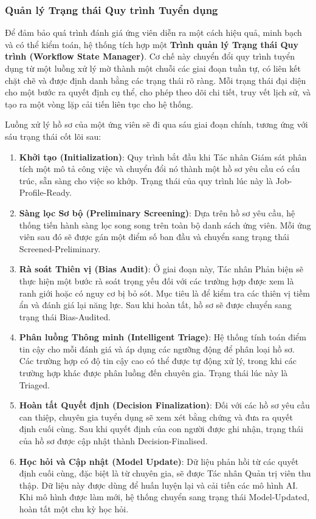 \documentclass{article}
\begin{document}
\begin{itemize}[topsep=0pt, itemsep=4pt, leftmargin=40pt]
\subsubsection{Quản lý Trạng thái Quy trình Tuyển dụng}
Để đảm bảo quá trình đánh giá ứng viên diễn ra một cách hiệu quả, minh bạch và có thể kiểm toán, hệ thống tích hợp một \textbf{Trình quản lý Trạng thái Quy trình (Workflow State Manager)}. Cơ chế này chuyển đổi quy trình tuyển dụng từ một luồng xử lý mờ thành một chuỗi các giai đoạn tuần tự, có liên kết chặt chẽ và được định danh bằng các trạng thái rõ ràng. Mỗi trạng thái đại diện cho một bước ra quyết định cụ thể, cho phép theo dõi chi tiết, truy vết lịch sử, và tạo ra một vòng lặp cải tiến liên tục cho hệ thống.

Luồng xử lý hồ sơ của một ứng viên sẽ đi qua sáu giai đoạn chính, tương ứng với sáu trạng thái cốt lõi sau:
\begin{enumerate}[topsep=0pt, itemsep=4pt, leftmargin=40pt, label=\arabic*.]
    \item \textbf{Khởi tạo (Initialization)}: Quy trình bắt đầu khi Tác nhân Giám sát phân tích một mô tả công việc và chuyển đổi nó thành một hồ sơ yêu cầu có cấu trúc, sẵn sàng cho việc so khớp. Trạng thái của quy trình lúc này là Job-Profile-Ready.
    \item \textbf{Sàng lọc Sơ bộ (Preliminary Screening)}: Dựa trên hồ sơ yêu cầu, hệ thống tiến hành sàng lọc song song trên toàn bộ danh sách ứng viên. Mỗi ứng viên sau đó sẽ được gán một điểm số ban đầu và chuyển sang trạng thái Screened-Preliminary.
    \item \textbf{Rà soát Thiên vị (Bias Audit)}: Ở giai đoạn này, Tác nhân Phản biện sẽ thực hiện một bước rà soát trọng yếu đối với các trường hợp được xem là ranh giới hoặc có nguy cơ bị bỏ sót. Mục tiêu là để kiểm tra các thiên vị tiềm ẩn và đánh giá lại năng lực. Sau khi hoàn tất, hồ sơ sẽ được chuyển sang trạng thái Bias-Audited.
    \item \textbf{Phân luồng Thông minh (Intelligent Triage)}: Hệ thống tính toán điểm tin cậy cho mỗi đánh giá và áp dụng các ngưỡng động để phân loại hồ sơ. Các trường hợp có độ tin cậy cao có thể được tự động xử lý, trong khi các trường hợp khác được phân luồng đến chuyên gia. Trạng thái lúc này là Triaged.
    \item \textbf{Hoàn tất Quyết định (Decision Finalization)}: Đối với các hồ sơ yêu cầu can thiệp, chuyên gia tuyển dụng sẽ xem xét bằng chứng và đưa ra quyết định cuối cùng. Sau khi quyết định của con người được ghi nhận, trạng thái của hồ sơ được cập nhật thành Decision-Finalised.
    \item \textbf{Học hỏi và Cập nhật (Model Update)}: Dữ liệu phản hồi từ các quyết định cuối cùng, đặc biệt là từ chuyên gia, sẽ được Tác nhân Quản trị viên thu thập. Dữ liệu này được dùng để huấn luyện lại và cải tiến các mô hình AI. Khi mô hình được làm mới, hệ thống chuyển sang trạng thái Model-Updated, hoàn tất một chu kỳ học hỏi.
\end{enumerate}


\end{itemize}
\end{document}
